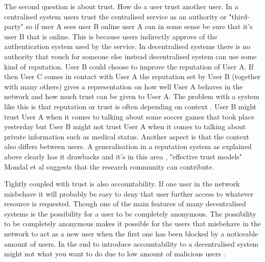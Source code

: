The second question is about trust.
How do a user trust another user.
In a centralised system users trust the centralised service as an authority or "third-party" so if user A sees user B online user A can in some sense be sure that it's user B that is online.
This is because users indirectly approve of the authentication system used by the service.
In decentralised systems there is no authority that vouch for someone else instead decentralised system can use some kind of reputation.
User B could choose to improve the reputation of User A.
If then User C comes in contact with User A the reputation set by User B (together with many others) gives a representation on how well User A behaves in the network and how much trust can be given to User A.
The problem with a system like this is that reputation or trust is often depending on context \cite{mondal2006}.
User B might trust User A when it comes to talking about some soccer games that took place yesterday but User B might not trust User A when it comes to talking about private information such as medical status.
Another aspect is that the context also differs between users.
A generalisation in a reputation system as explained above clearly has it drawbacks and it's in this area , "effective trust models" Mondal et al \cite{mondal2006} suggests that the research community can contribute.

Tightly coupled with trust is also accountability.
If one user in the network misbehave it will probably be easy to deny that user further access to whatever resource is requested.
Though one of the main features of many decentralised systems is the possibility for a user to be completely anonymous.
The possibility to be completely anonymous makes it possible for the users that misbehave in the network to act as a new user when the first one has been blocked by a noticeable amount of users.
In the end to introduce accountability to a decentralised system might not what you want to do due to low amount of malicious users \cite{mondal2006}.

